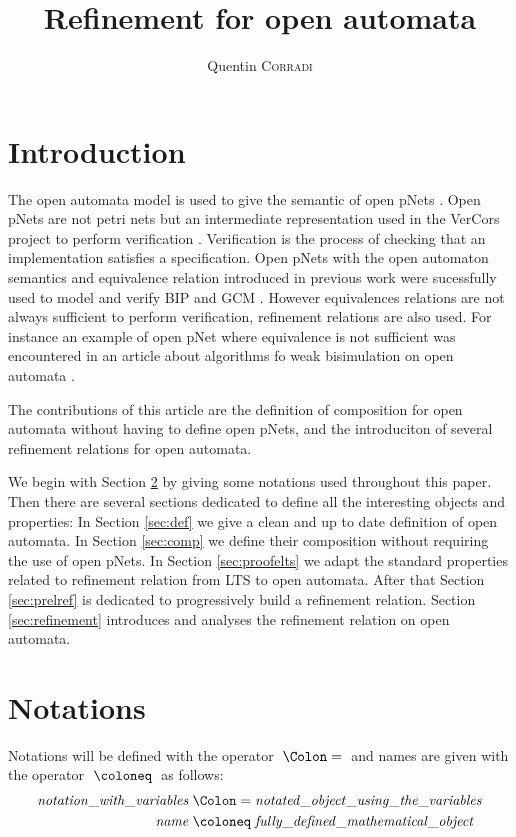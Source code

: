 \documentclass{article}
\title{Refinement for open automata}
\author{Quentin \textsc{Corradi}}
\begin{document}
\maketitle

\section{Introduction}
The open automata model is used to give the semantic of open pNets \cite{2007.10770}.
Open pNets are not petri nets but an intermediate representation used in the VerCors project to perform verification \cite{henrio:01252323}.
Verification is the process of checking that an implementation satisfies a specification.
Open pNets with the open automaton semantics and equivalence relation introduced in previous work \cite{2007.10770} were sucessfully used to model and verify BIP and GCM \cite{qin:01823507, ameurboulifa:01526055}.
However equivalences relations are not always sufficient to perform verification, refinement relations are also used.
For instance an example of open pNet where equivalence is not sufficient was encountered in an article about algorithms fo weak bisimulation on open automata \cite{wang:03126313}.

The contributions of this article are the definition of composition for open automata without having to define open pNets, and the introduciton of several refinement relations for open automata.


We begin with Section \ref{sec:notations} by giving some notations used throughout this paper.
Then there are several sections dedicated to define all the interesting objects and properties:
In Section \ref{sec:def} we give a clean and up to date definition of open automata.
In Section \ref{sec:comp} we define their composition without requiring the use of open pNets.
In Section \ref{sec:proofelts} we adapt the standard properties related to refinement relation from LTS to open automata.
After that Section \ref{sec:prelref} is dedicated to progressively build a refinement relation.
Section \ref{sec:refinement} introduces and analyses the refinement relation on open automata.


\section{Notations}\label{sec:notations}
Notations will be defined with the operator \(\defnotation\) and names are given with the operator \(\defobject\) as follows:
\begin{align*}
	\mathit{notation\_with\_variables} & \defnotation \mathit{notated\_object\_using\_the\_variables} \\
	\mathit{name} & \defobject \mathit{fully\_defined\_mathematical\_object}
\end{align*}
\end{document}
